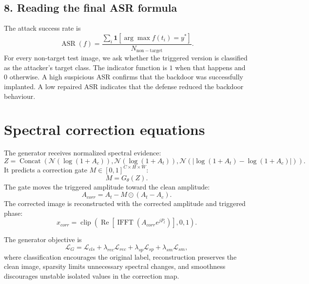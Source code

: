 \documentclass[11pt]{article}
\begin{document}
\subsection*{8. Reading the final ASR formula}
The attack success rate is
\begin{equation}
    \operatorname{ASR}(f)=
    \frac{\sum_i\mathbf{1}\left[\arg\max f(t_i)=y^*\right]}
    {N_{\mathrm{non-target}}}.
\end{equation}
For every non-target test image, we ask whether the triggered version is
classified as the attacker's target class. The indicator function is $1$ when
that happens and $0$ otherwise. A high suspicious ASR confirms that the
backdoor was successfully implanted. A low repaired ASR indicates that the
defense reduced the backdoor behaviour.

\section*{Spectral correction equations}
The generator receives normalized spectral evidence:
\begin{equation}
    Z=\operatorname{Concat}\left(\mathcal{N}(\log(1+A_c)),
    \mathcal{N}(\log(1+A_t)),
    \mathcal{N}\left(|\log(1+A_t)-\log(1+A_c)|\right)\right).
\end{equation}
It predicts a correction gate $M\in[0,1]^{C\times H\times W}$:
\begin{equation}
    M=G_\theta(Z).
\end{equation}
The gate moves the triggered amplitude toward the clean amplitude:
\begin{equation}
    A_{corr}=A_t-M\odot(A_t-A_c).
\end{equation}
The corrected image is reconstructed with the corrected amplitude and triggered
phase:
\begin{equation}
    x_{corr}=\operatorname{clip}\left(\operatorname{Re}\left[
    \operatorname{IFFT}\left(A_{corr}e^{jP_t}\right)\right],0,1\right).
\end{equation}

The generator objective is
\begin{equation}
    \mathcal{L}_G=\mathcal{L}_{cls}
    +\lambda_{rec}\mathcal{L}_{rec}
    +\lambda_{sp}\mathcal{L}_{sp}
    +\lambda_{sm}\mathcal{L}_{sm},
\end{equation}
where classification encourages the original label, reconstruction preserves
the clean image, sparsity limits unnecessary spectral changes, and smoothness
discourages unstable isolated values in the correction map.
\end{document}
